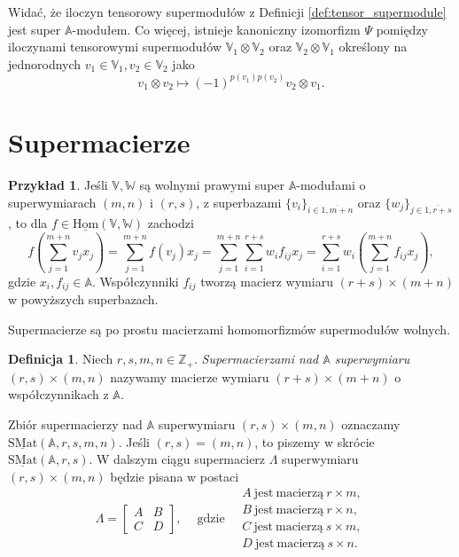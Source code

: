 \documentclass[11pt,a4paper]{report}
\theoremstyle{definition}
\newtheorem{example}[theorem]{Przykład}
\newtheorem{definition}[theorem]{Definicja}
\begin{document}
Widać, że iloczyn tensorowy supermodułów z Definicji \ref{def:tensor_supermodule} jest super $\mathbb{A}$-modułem. Co więcej, istnieje kanoniczny izomorfizm $\Psi$ pomiędzy iloczynami tensorowymi supermodułów $\mathbb{V}_1 \otimes \mathbb{V}_2$ oraz $\mathbb{V}_2 \otimes \mathbb{V}_1$ określony na jednorodnych $v_1 \in \mathbb{V}_1, v_2 \in \mathbb{V}_2$ jako
\begin{equation*}
	v_1 \otimes v_2 \mapsto (-1)^{p(v_1)p(v_2)} v_2 \otimes v_1.
\end{equation*}

\section{Supermacierze}

\begin{example}
	\label{ex:supermatrix_motivation}
	Jeśli $\mathbb{V},\mathbb{W}$ są wolnymi prawymi super $\mathbb{A}$-modułami o superwymiarach $(m,n)$ i $(r,s)$, z superbazami $\{ v_i \}_{i \in \overline{1,m+n}}$ oraz $\{ w_j \}_{j\in \overline{1,r+s}}$, to dla $f \in \underline{\mathrm{Hom}}(\mathbb{V},\mathbb{W})$ zachodzi
	\begin{equation}
		f\left( \sum_{j=1}^{m+n} v_j x_j \right) = \sum_{j=1}^{m+n} f(v_j) x_j = \sum_{j=1}^{m+n} \sum_{i=1}^{r+s} w_i f_{ij} x_j = \sum_{i=1}^{r+s} w_i \left( \sum_{j=1}^{m+n} f_{ij} x_j \right),
		\label{eq:free_supermodule_homomorphism}
	\end{equation}
	gdzie $x_i, f_{ij} \in \mathbb{A}$. Współczynniki $f_{ij}$ tworzą macierz wymiaru $(r+s) \times (m+n)$ w powyższych superbazach.
\end{example}

Supermacierze są po prostu macierzami homomorfizmów supermodułów wolnych.

\begin{definition}
	Niech $r,s,m,n \in \mathbb{Z}_+$. \textit{Supermacierzami nad $\mathbb{A}$ superwymiaru $(r,s)\times(m,n)$} nazywamy macierze wymiaru $(r+s)\times(m+n)$ o współczynnikach z $\mathbb{A}$.
\end{definition}

Zbiór supermacierzy nad $\mathbb{A}$ superwymiaru $(r,s)\times(m,n)$ oznaczamy $\underline{\mathrm{SMat}}(\mathbb{A},r,s,m,n).$ Jeśli $(r,s)=(m,n)$, to piszemy w skrócie $\underline{\mathrm{SMat}}(\mathbb{A},r,s).$ W dalszym ciągu supermacierz $\Lambda$ superwymiaru $(r,s)\times(m,n)$ będzie pisana w postaci
\begin{equation}
	\label{eq:supermatrix_shape}
	\Lambda=\begin{bmatrix}
	A & B \\
	C & D
	\end{bmatrix}\!\!, \quad \ \mathrm{gdzie} \quad 
	\begin{array}{l}
		A \mathrm{\ jest\ macierzą\ } r \times m, \\
		B \mathrm{\ jest\ macierzą\ } r \times n, \\
		C \mathrm{\ jest\ macierzą\ } s \times m, \\
		D \mathrm{\ jest\ macierzą\ } s \times n. 
	\end{array}
\end{equation}
\end{document}
